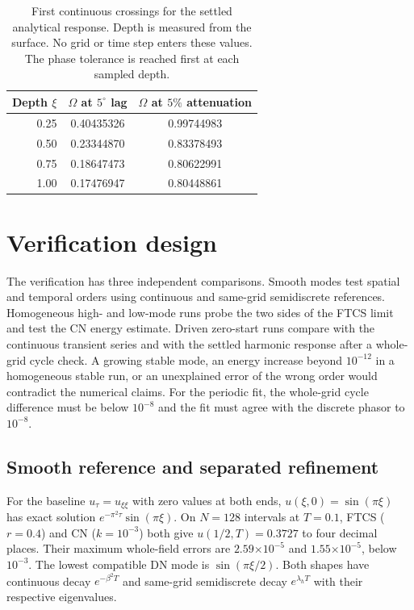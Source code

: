 \documentclass[11pt,a4paper]{article}
\newcommand{\degree}{^{\circ}}
\newcommand{\sci}[2]{#1\mathord{\times}10^{#2}}
\begin{document}
\begin{table}[!ht]\centering
\caption{First continuous crossings for the settled analytical response. Depth is measured from the surface. No grid or time step enters these values. The phase tolerance is reached first at each sampled depth.}
\begin{tabular}{@{}rcc@{}}\toprule
Depth $\xi$ & $\Omega$ at $5\degree$ lag & $\Omega$ at $5\%$ attenuation \\ \midrule
0.25 & 0.40435326 & 0.99744983 \\
0.50 & 0.23344870 & 0.83378493 \\
0.75 & 0.18647473 & 0.80622991 \\
1.00 & 0.17476947 & 0.80448861 \\
\bottomrule\end{tabular}
\end{table}

\clearpage
\section{Verification design}\label{sec:design}
The verification has three independent comparisons. Smooth modes test spatial and temporal orders using continuous and same-grid semidiscrete references. Homogeneous high- and low-mode runs probe the two sides of the FTCS limit and test the CN energy estimate. Driven zero-start runs compare with the continuous transient series and with the settled harmonic response after a whole-grid cycle check. A growing stable mode, an energy increase beyond $10^{-12}$ in a homogeneous stable run, or an unexplained error of the wrong order would contradict the numerical claims. For the periodic fit, the whole-grid cycle difference must be below $10^{-8}$ and the fit must agree with the discrete phasor to $10^{-8}$.

\subsection{Smooth reference and separated refinement}
For the baseline $u_\tau=u_{\xi\xi}$ with zero values at both ends, $u(\xi,0)=\sin(\pi\xi)$ has exact solution $e^{-\pi^2\tau}\sin(\pi\xi)$. On $N=128$ intervals at $T=0.1$, FTCS ($r=0.4$) and CN ($k=10^{-3}$) both give $u(1/2,T)=0.3727$ to four decimal places. Their maximum whole-field errors are $\sci{2.59}{-5}$ and $\sci{1.55}{-5}$, below $10^{-3}$. The lowest compatible DN mode is $\sin(\pi\xi/2)$. Both shapes have continuous decay $e^{-\beta^2 T}$ and same-grid semidiscrete decay $e^{\lambda_h T}$ with their respective eigenvalues.
\end{document}

